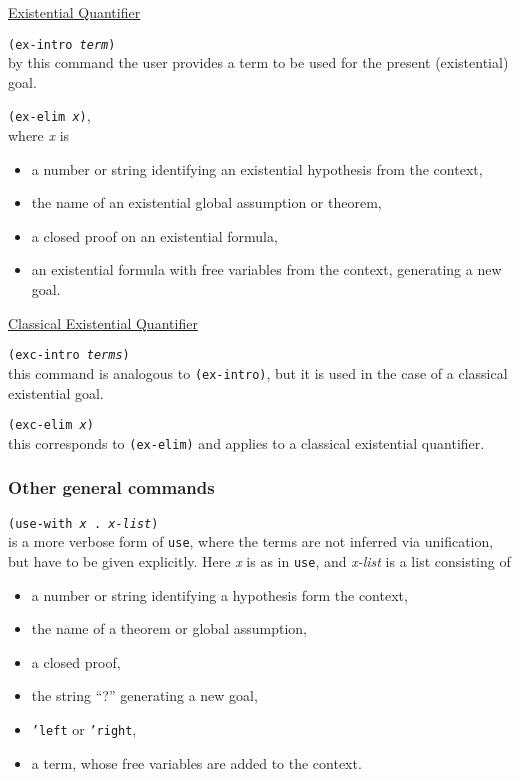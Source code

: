 \documentclass[12pt]{amsart}
\newcommand{\inquotes}[1]{``#1''}
\begin{document}
\begin{appendix}
\underline{Existential Quantifier}

\texttt{(ex-intro \textsl{term})}\\
by this command the user provides a term to be used for
the present (existential) goal.

\texttt{(ex-elim \textsl{x})},\\
where \textsl{x} is
\begin{itemize}
\item a number or string identifying an existential hypothesis from
  the context,
\item the name of an existential global assumption or theorem,
\item a closed proof on an existential formula,
\item an existential formula with free variables from the context,
  genera\-ting a new goal.
\end{itemize}

\underline{Classical Existential Quantifier}

\texttt{(exc-intro \textsl{terms})}\\
this command is analogous to \texttt{(ex-intro)}, but
it is used in the case of a classical existential goal.

\texttt{(exc-elim \textsl{x})}\\
this corresponds to \texttt{(ex-elim)} and applies to a classical
existential quantifier.

\subsubsection{Other general commands}

\texttt{(use-with \textsl{x} . \textsl{x-list})}
\\
is a more verbose form of \texttt{use}, where the terms are not
inferred via unification, but have to be given explicitly. Here
\textsl{x} is as in \texttt{use}, and \textsl{x-list} is a list
consisting of
\begin{itemize}
\item a number or string identifying a hypothesis form the context,
\item the name of a theorem or global assumption,
\item a closed proof,
\item the string \inquotes{?}  generating a new goal,
\item \texttt{'left} or \texttt{'right},
\item a term, whose free variables are added to the context.
\end{itemize}


\end{appendix}
\end{document}
